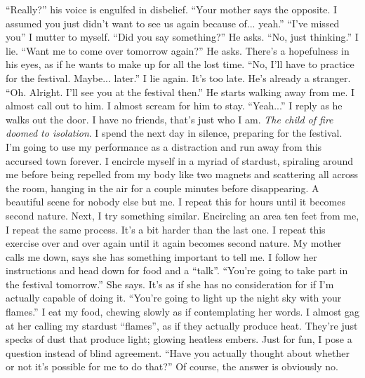 \documentclass[openany, 12pt]{book}
\newcommand\tab[1][1cm]{\hspace*{#1}}
\begin{document}
\newline
\tab
``Really?'' his voice is engulfed in disbelief. ``Your mother says the opposite. I assumed you just didn’t want to see us again because of... yeah.''
\newline
\tab
``I’ve missed you'' I mutter to myself.
\newline
\tab
``Did you say something?'' He asks.
\newline
\tab
``No, just thinking.'' I lie.
\newline
\tab
``Want me to come over tomorrow again?'' He asks. There’s a hopefulness in his eyes, as if he wants to make up for all the lost time.
\newline
\tab
``No, I’ll have to practice for the festival. Maybe... later.'' I lie again. It’s too late. He’s already a stranger.
\newline
\tab
``Oh. Alright. I’ll see you at the festival then.'' He starts walking away from me. I almost call out to him. I almost scream for him to stay.
\newline
\tab
``Yeah...'' I reply as he walks out the door. I have no friends, that’s just who I am. \textit{The child of fire doomed to isolation}.
\newline
\tab
I spend the next day in silence, preparing for the festival. I’m going to use my performance as a distraction and run away from this accursed town forever. I encircle myself in a myriad of stardust, spiraling around me before being repelled from my body like two magnets and scattering all across the room, hanging in the air for a couple minutes before disappearing. A beautiful scene for nobody else but me. I repeat this for hours until it becomes second nature.
\newline
\tab
Next, I try something similar. Encircling an area ten feet from me, I repeat the same process. It’s a bit harder than the last one. I repeat this exercise over and over again until it again becomes second nature. My mother calls me down, says she has something important to tell me. I follow her instructions and head down for food and a ``talk''.
\newline
\tab
``You’re going to take part in the festival tomorrow.'' She says. It’s as if she has no consideration for if I’m actually capable of doing it. ``You’re going to light up the night sky with your flames.''
\newline
\tab
I eat my food, chewing slowly as if contemplating her words. I almost gag at her calling my stardust ``flames'', as if they actually produce heat. They’re just specks of dust that produce light; glowing heatless embers. Just for fun, I pose a question instead of blind agreement. ``Have you actually thought about whether or not it’s possible for me to do that?'' Of course, the answer is obviously no.
\end{document}
